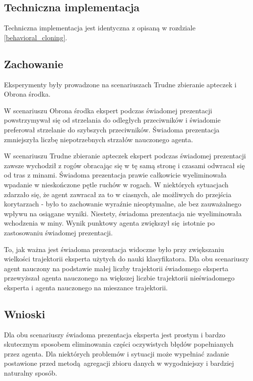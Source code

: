 \documentclass[polish,master,a4paper,oneside]{ppfcmthesis}
\begin{document}
\subsection{Techniczna implementacja}

Techniczna implementacja jest identyczna z opisaną w rozdziale \ref{behavioral_cloning}.

\subsection{Zachowanie}
Eksperymenty były prowadzone na scenariuszach Trudne zbieranie apteczek i Obrona środka.

W scenariuszu Obrona środka ekspert podczas świadomej prezentacji powstrzymywał się od strzelania do odległych przeciwników i świadomie preferował strzelanie do szybszych przeciwników. Świadoma prezentacja zmniejszyła liczbę niepotrzebnych strzałów nauczonego agenta.

W scenariuszu Trudne zbieranie apteczek ekspert podczas świadomej prezentacji zawsze wychodził z rogów obracając się w tę samą stronę i czasami odwracał się od tras z minami. Świadoma prezentacja prawie całkowicie wyeliminowała wpadanie w nieskończone pętle ruchów w rogach. W niektórych sytuacjach zdarzało się, że agent zawracał za to w ciasnych, ale możliwych do przejścia korytarzach - było to zachowanie wyraźnie nieoptymalne, ale bez zauważalnego wpływu na osiągane wyniki. Niestety, świadoma prezentacja nie wyeliminowała wchodzenia w miny. Wynik punktowy agenta zwiększył się istotnie po zastosowaniu świadomej prezentacji.

To, jak ważna jest świadoma prezentacja widoczne było przy zwiększaniu wielkości trajektorii eksperta użytych do nauki klasyfikatora. Dla obu scenariuszy agent nauczony na podstawie małej liczby trajektorii świadomego eksperta przewyższał agenta nauczonego na większej liczbie trajektorii nieświadomego eksperta i agenta nauczonego na mieszance trajektorii. 
 
\subsection{Wnioski}

Dla obu scenariuszy świadoma prezentacja eksperta jest prostym i bardzo skutecznym sposobem eliminowania części oczywistych błędów popełnianych przez agenta. Dla niektórych problemów i sytuacji może wypełniać zadanie postawione przed metodą agregacji zbioru danych w wygodniejszy i bardziej naturalny sposób.
\end{document}

